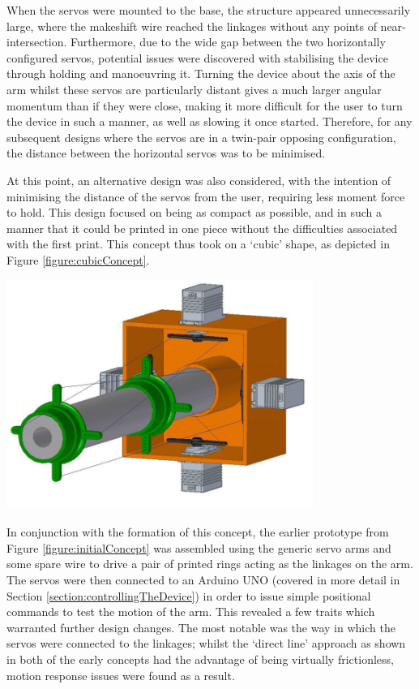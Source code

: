 \documentclass[11pt]{article}
\begin{document}
When the servos were mounted to the base, the structure appeared unnecessarily large, where the makeshift wire reached the linkages without any points of near-intersection. Furthermore, due to the wide gap between the two horizontally configured servos, potential issues were discovered with stabilising the device through holding and manoeuvring it. Turning the device about the axis of the arm whilst these servos are particularly distant gives a much larger angular momentum than if they were close, making it more difficult for the user to turn the device in such a manner, as well as slowing it once started. Therefore, for any subsequent designs where the servos are in a twin-pair opposing configuration, the distance between the horizontal servos was to be minimised.

At this point, an alternative design was also considered, with the intention of minimising the distance of the servos from the user, requiring less moment force to hold. This design focused on being as compact as possible, and in such a manner that it could be printed in one piece without the difficulties associated with the first print. This concept thus took on a `cubic' shape, as depicted in Figure \ref{figure:cubicConcept}.

\begin{center}
\includegraphics[width=0.75\textwidth]{images/cubicConcept.png}
\label{figure:cubicConcept}
\end{center}

In conjunction with the formation of this concept, the earlier prototype from Figure \ref{figure:initialConcept} was assembled using the generic servo arms and some spare wire to drive a pair of printed rings acting as the linkages on the arm. The servos were then connected to an Arduino UNO (covered in more detail in Section \ref{section:controllingTheDevice}) in order to issue simple positional commands to test the motion of the arm. This revealed a few traits which warranted further design changes. The most notable was the way in which the servos were connected to the linkages; whilst the `direct line' approach as shown in both of the early concepts had the advantage of being virtually frictionless, motion response issues were found as a result. 
\end{document}
